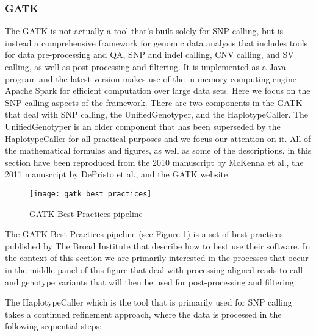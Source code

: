 \subsubsection{GATK}
\label{sec:bg_gatk}
The GATK\autocite{depristo2011framework} is not actually a tool that's built solely for SNP calling, but is instead a comprehensive framework for genomic data analysis that includes tools for data pre-processing and QA, SNP and indel calling, CNV calling, and SV calling, as well as post-processing and filtering. It is implemented as a Java program and the latest version makes use of the in-memory computing engine Apache Spark for efficient computation over large data sets. Here we focus on the SNP calling aspects of the framework. There are two components in the GATK that deal with SNP calling, the UnifiedGenotyper, and the HaplotypeCaller. The UnifiedGenotyper is an older component that has been superseded by the HaplotypeCaller for all practical purposes and we focus our attention on it. All of the mathematical formulas and figures, as well as some of the descriptions, in this section have been reproduced from the 2010 manuscript by McKenna et al.\autocite{mckenna2010genome}, the 2011 manuscript by DePristo et al.\autocite{depristo2011framework}, and the GATK website\autocite{gatkwebsite}

\begin{figure}[!htb]
\texttt{[image: gatk\_best\_practices]}
\centering
\caption {GATK Best Practices pipeline\autocite{gatkwebsite}}
\label{fig:gatk_best_practices}
\end{figure}

The GATK Best Practices pipeline (see Figure \ref{fig:gatk_best_practices}) is a set of best practices published by The Broad Institute that describe how to best use their software. In the context of this section we are primarily interested in the processes that occur in the middle panel of this figure that deal with processing aligned reads to call and genotype variants that will then be used for post-processing and filtering.

The HaplotypeCaller which is the tool that is primarily used for SNP calling takes a continued refinement approach, where the data is processed in the following sequential steps:

